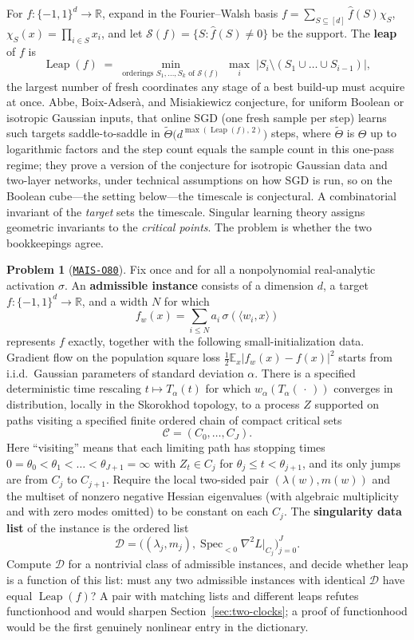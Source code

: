 \documentclass[11pt]{amsart}
\newcommand{\Oid}[1]{\href{https://github.com/lionellevine/MAIS/blob/main/open-problems/MAIS-O#1.md}{\texttt{MAIS-O#1}}}
\theoremstyle{plain}
\theoremstyle{definition}
\newtheorem{problem}[theorem]{Problem}
\newcommand{\R}{\mathbb{R}}
\newcommand{\E}{\mathbb{E}}
\begin{document}
For $f\colon \{-1, 1\}^d \to \R$, expand in the Fourier--Walsh basis $f = \sum_{S \subseteq [d]} \hat f(S) \chi_S$, $\chi_S(x) = \prod_{i \in S} x_i$, and let $\mathcal{S}(f) = \{ S : \hat f(S) \neq 0 \}$ be the support. The \textbf{leap} of $f$ is
\[
   \operatorname{Leap}(f) \;=\; \min_{\text{orderings } S_1, \dots, S_k \text{ of } \mathcal S(f)} \; \max_{i} \; \bigl| S_i \setminus (S_1 \cup \dots \cup S_{i-1}) \bigr| ,
\]
the largest number of fresh coordinates any stage of a best build-up must acquire at once. Abbe, Boix-Adser\`a, and Misiakiewicz \cite{abbe2023} conjecture, for uniform Boolean or isotropic Gaussian inputs, that online SGD (one fresh sample per step) learns such targets saddle-to-saddle in $\tilde\Theta\bigl(d^{\max(\operatorname{Leap}(f),\,2)}\bigr)$ steps, where $\tilde\Theta$ is $\Theta$ up to logarithmic factors and the step count equals the sample count in this one-pass regime; they prove a version of the conjecture for isotropic Gaussian data and two-layer networks, under technical assumptions on how SGD is run, so on the Boolean cube---the setting below---the timescale is conjectural. A combinatorial invariant of the \emph{target} sets the timescale. Singular learning theory assigns geometric invariants to the \emph{critical points}. The problem is whether the two bookkeepings agree.

\begin{problem}[\Oid{80}]\label{prob:leap}
Fix once and for all a nonpolynomial real-analytic activation $\sigma$. An \textbf{admissible instance} consists of a dimension $d$, a target $f\colon\{-1,1\}^d\to\R$, and a width $N$ for which
\[
   f_w(x)=\sum_{i\le N}a_i\,\sigma(\langle w_i,x\rangle)
\]
represents $f$ exactly, together with the following small-initialization data. Gradient flow on the population square loss $\tfrac12\E_x|f_w(x)-f(x)|^2$ starts from i.i.d.\ Gaussian parameters of standard deviation $\alpha$. There is a specified deterministic time rescaling $t\mapsto T_\alpha(t)$ for which $w_\alpha(T_\alpha(\,\cdot\,))$ converges in distribution, locally in the Skorokhod topology, to a process $Z$ supported on paths visiting a specified finite ordered chain of compact critical sets
\[
   \mathcal C=(C_0,\dots,C_J).
\]
Here ``visiting'' means that each limiting path has stopping times $0=\theta_0<\theta_1<\dots<\theta_{J+1}=\infty$ with $Z_t\in C_j$ for $\theta_j\le t<\theta_{j+1}$, and its only jumps are from $C_j$ to $C_{j+1}$.
Require the local two-sided pair $(\lambda(w),m(w))$ and the multiset of nonzero negative Hessian eigenvalues (with algebraic multiplicity and with zero modes omitted) to be constant on each $C_j$. The \textbf{singularity data list} of the instance is the ordered list
\[
   \mathcal D
   =
   \bigl((\lambda_j,m_j),\operatorname{Spec}_{<0}\nabla^2L|_{C_j}\bigr)_{j=0}^{J}.
\]
Compute $\mathcal D$ for a nontrivial class of admissible instances, and decide whether leap is a function of this list: must any two admissible instances with identical $\mathcal D$ have equal $\operatorname{Leap}(f)$? A pair with matching lists and different leaps refutes functionhood and would sharpen Section~\ref{sec:two-clocks}; a proof of functionhood would be the first genuinely nonlinear entry in the dictionary.
\end{problem}
\end{document}
